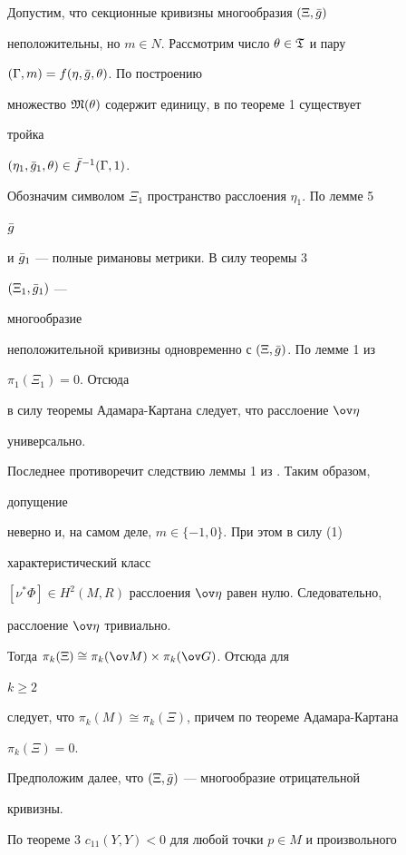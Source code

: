 \begin{pf} Допустим, что секционные кривизны многообразия $(\Xi,\Bar g)$ 


неположительны, но $m\in N$. Рассмотрим число $\theta\in\frak T$ и пару 


$(\Gamma,m)=f(\eta,\Bar g,\theta)$. По построению 


множество $\frak M(\theta)$ содержит единицу, в по теореме 1 существует 


тройка 


$(\eta_1,\Bar g_1,\theta)\in\Bar f^{-1}(\Gamma,1)$. 


Обозначим символом $\Xi_1$ пространство расслоения $\eta_1$. По лемме 5 


$\Bar g$ 


и $\Bar g_1$ --- полные римановы метрики. В силу теоремы 3 


$(\Xi_1,\Bar g_1)$ --- 


многообразие 


неположительной кривизны одновременно с $(\Xi,\Bar g)$. По лемме 1 из 


\cite{Yak} $\pi_1(\Xi_1)=0$. Отсюда 


в силу теоремы Адамара-Картана следует, что расслоение $\ov\eta$ 


универсально. 


Последнее противоречит следствию леммы 1 из \cite{Yak}. Таким образом, 


допущение 


неверно и, на самом деле, $m\in\{-1,0\}$. При этом в силу (1) 


характеристический класс 


$[\nu^*\Phi]\in H^2(M,R)$ расслоения $\ov\eta$ равен нулю. Следовательно, 


расслоение $\ov\eta$ тривиально. 


Тогда $\pi_k(\Xi)\cong\pi_k(\ov M)\times\pi_k(\ov G)$. Отсюда для 


$k\ge 2$ 


следует, что $\pi_k(M)\cong\pi_k(\Xi)$, причем по теореме Адамара-Картана 


$\pi_k(\Xi)=0$. 


 


Предположим далее, что $(\Xi,\Bar g)$ --- многообразие отрицательной 


кривизны. 


По теореме 3 $c_{11}(Y,Y)<0$ для любой точки $p\in M$ и произвольного 



\end{pf}
